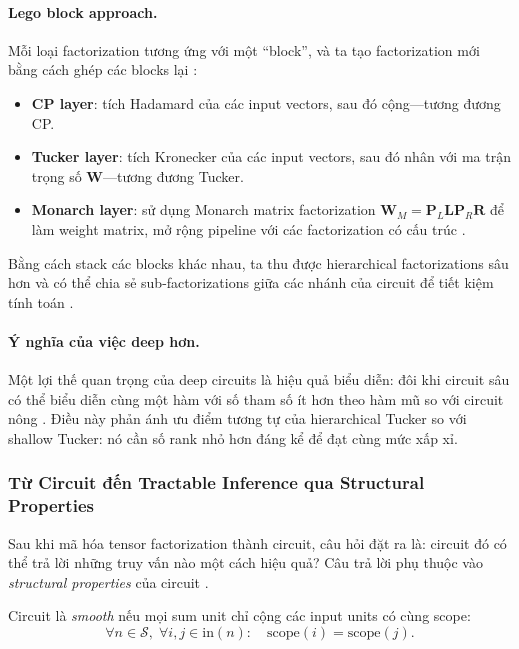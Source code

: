 \paragraph{Lego block approach.}
Mỗi loại factorization tương ứng với một ``block'', và ta tạo factorization mới bằng cách
ghép các blocks lại \cite{chrysos2025foundationsTutorial}:
\begin{itemize}[leftmargin=2em]
    \item \textbf{CP layer}: tích Hadamard của các input vectors, sau đó cộng---tương
    đương CP.
    \item \textbf{Tucker layer}: tích Kronecker của các input vectors, sau đó nhân
    với ma trận trọng số $\mathbf{W}$---tương đương Tucker.
    \item \textbf{Monarch layer}: sử dụng Monarch matrix factorization
    $\mathbf{W}_M = \mathbf{P}_L \mathbf{L} \mathbf{P}_R \mathbf{R}$ để làm
    weight matrix, mở rộng pipeline với các factorization có cấu trúc
    \cite{chrysos2025foundationsTutorial}.
\end{itemize}
Bằng cách stack các blocks khác nhau, ta thu được hierarchical factorizations sâu hơn
và có thể chia sẻ sub-factorizations giữa các nhánh của circuit để tiết kiệm tính toán
\cite{loconte2025relationship}.

\paragraph{Ý nghĩa của việc deep hơn.}
Một lợi thế quan trọng của deep circuits là hiệu quả biểu diễn: đôi khi circuit sâu
có thể biểu diễn cùng một hàm với số tham số ít hơn theo hàm mũ so với circuit nông
\cite{loconte2025relationship}. Điều này phản ánh ưu điểm tương tự của hierarchical
Tucker so với shallow Tucker: nó cần số rank nhỏ hơn đáng kể để đạt cùng mức xấp xỉ.

\subsubsection{Từ Circuit đến Tractable Inference qua Structural Properties}

Sau khi mã hóa tensor factorization thành circuit, câu hỏi đặt ra là: circuit đó
có thể trả lời những truy vấn nào một cách hiệu quả?  Câu trả lời phụ thuộc vào
\emph{structural properties} của circuit \cite{vergari2021compositional}.

\begin{definition}
\label{def:smoothness}
Circuit là \emph{smooth} nếu mọi sum unit chỉ cộng các input units có cùng scope:
\begin{equation}
    \forall n \in \mathcal{S},\;
    \forall i, j \in \mathrm{in}(n):\quad
    \mathrm{scope}(i) = \mathrm{scope}(j).
\end{equation}
\end{definition}

